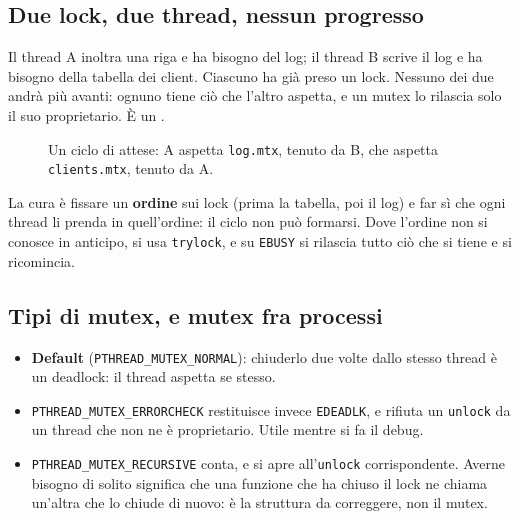 \subsection{Due lock, due thread, nessun progresso}

Il thread A inoltra una riga e ha bisogno del log; il thread B scrive il log e ha bisogno della tabella dei client.
Ciascuno ha già preso un lock. Nessuno dei due andrà più avanti: ognuno tiene ciò che l'altro aspetta, e un mutex lo
rilascia solo il suo proprietario. È un .

\begin{figure}[H]
\centering
{}
\caption{Un ciclo di attese: A aspetta \texttt{log.mtx}, tenuto da B, che aspetta \texttt{clients.mtx}, tenuto da A.}
\end{figure}

La cura è fissare un \textbf{ordine} sui lock (prima la tabella, poi il log) e far sì che ogni thread li prenda in
quell'ordine: il ciclo non può formarsi. Dove l'ordine non si conosce in anticipo, si usa \texttt{trylock}, e su
\texttt{EBUSY} si rilascia tutto ciò che si tiene e si ricomincia.

\subsection{Tipi di mutex, e mutex fra processi}

\begin{itemize}
    \item \textbf{Default} (\texttt{PTHREAD\_MUTEX\_NORMAL}): chiuderlo due volte dallo stesso thread è un deadlock: il
          thread aspetta se stesso.
    \item \texttt{PTHREAD\_MUTEX\_ERRORCHECK} restituisce invece \texttt{EDEADLK}, e rifiuta un \texttt{unlock} da un thread
          che non ne è proprietario. Utile mentre si fa il debug.
    \item \texttt{PTHREAD\_MUTEX\_RECURSIVE} conta, e si apre all'\texttt{unlock} corrispondente. Averne bisogno di solito
          significa che una funzione che ha chiuso il lock ne chiama un'altra che lo chiude di nuovo: è la struttura da
          correggere, non il mutex.
\end{itemize}

